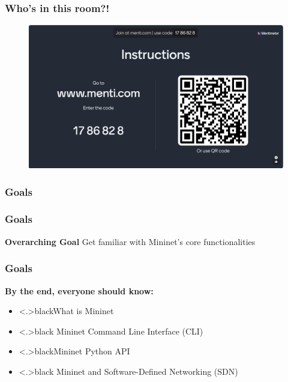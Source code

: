 \documentclass{beamer}
\begin{document}
\begin{frame}
  \frametitle{Who's in this room?!}
  \begin{figure}
    \begin{center}
      \includegraphics[scale=0.175]{images/menti.png}
    \end{center}
  \end{figure}
\end{frame}

\begin{frame}
  \frametitle{Goals}
\end{frame}

\begin{frame}
  \frametitle{Goals}

  \begin{block}{\textbf{Overarching Goal}} 
    Get familiar with Mininet's core functionalities
  \end{block}

\end{frame}

\begin{frame}
  \frametitle{Goals}

  \begin{block}{\textbf{By the end, everyone should know:}}

    \begin{itemize}[<+->]\color{black}
    \item[\ding{51}] \color<.>{black}What is Mininet
    \item[\ding{51}] \color<.>{black} Mininet Command Line Interface (CLI)
    \item[\ding{51}] \color<.>{black}Mininet Python API
    \item[\ding{51}] \color<.>{black} Mininet and Software-Defined
      Networking (SDN)
    \end{itemize}

  \end{block}

\end{frame}
\end{document}
